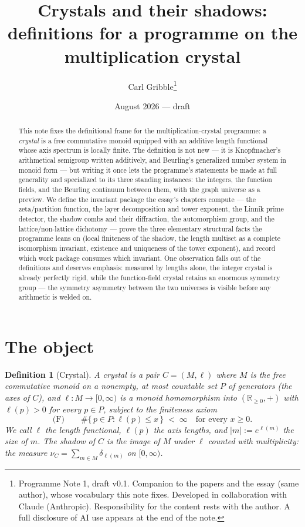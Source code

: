 \documentclass[11pt]{article}
\title{Crystals and their shadows:\\ definitions for a programme on the multiplication crystal}
\author{Carl Gribble\thanks{Programme Note 1, draft v0.1. Companion to the papers
\cite{CompanionI,CompanionII,CompanionIII} and the essay \cite{Essay} (same author), whose vocabulary
this note fixes. Developed in collaboration with Claude (Anthropic). Responsibility for the content
rests with the author. A full disclosure of AI use appears at the end of the note.}}
\date{August 2026 --- draft}
\newtheorem{definition}{Definition}
\theoremstyle{remark}
\newcommand{\R}{\mathbb{R}}
\begin{document}
\maketitle

\begin{abstract}
This note fixes the definitional frame for the multiplication-crystal programme: a \emph{crystal} is
a free commutative monoid equipped with an additive length functional whose axis spectrum is locally
finite. The definition is not new --- it is Knopfmacher's arithmetical semigroup written additively,
and Beurling's generalized number system in monoid form --- but writing it once lets the programme's
statements be made at full generality and specialized to its three standing instances: the integers,
the function fields, and the Beurling continuum between them, with the graph universe as a preview.
We define the invariant package the essay's chapters compute --- the zeta/partition function, the
layer decomposition and tower exponent, the Linnik prime detector, the shadow combs and their
diffraction, the automorphism group, and the lattice/non-lattice dichotomy --- prove the three
elementary structural facts the programme leans on (local finiteness of the shadow, the length
multiset as a complete isomorphism invariant, existence and uniqueness of the tower exponent), and
record which work package consumes which invariant. One observation falls out of the definitions and
deserves emphasis: measured by lengths alone, the integer crystal is already perfectly rigid, while
the function-field crystal retains an enormous symmetry group --- the symmetry asymmetry between the
two universes is visible before any arithmetic is welded on.
\end{abstract}

\section{The object}

\begin{definition}[Crystal]\label{def:crystal}
A \emph{crystal} is a pair $C = (M, \ell)$ where $M$ is the free commutative monoid on a nonempty,
at most countable set $P$ of generators (the \emph{axes} of $C$), and
$\ell \colon M \to [0, \infty)$ is a monoid homomorphism into $(\R_{\ge 0}, +)$ with $\ell(p) > 0$
for every $p \in P$, subject to the finiteness axiom
\[
\text{(F)}\qquad \#\{\, p \in P : \ell(p) \le x \,\} \;<\; \infty \quad\text{for every } x \ge 0 .
\]
We call $\ell$ the \emph{length functional}, $\ell(p)$ the \emph{axis lengths}, and
$|m| := e^{\ell(m)}$ the \emph{size} of $m$. The \emph{shadow} of $C$ is the image of $M$ under
$\ell$ counted with multiplicity: the measure $\nu_C = \sum_{m \in M} \delta_{\ell(m)}$ on
$[0, \infty)$.
\end{definition}
\end{document}
